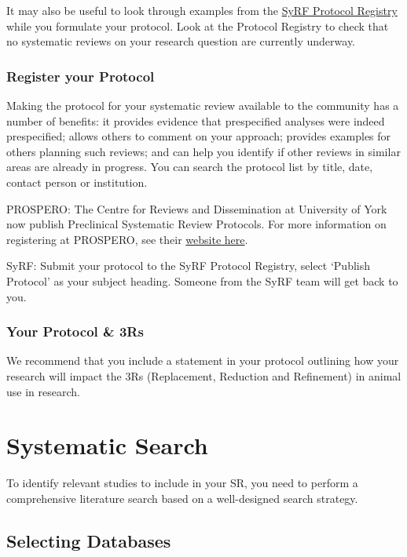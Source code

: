 \documentclass[
]{book}
\begin{document}
It may also be useful to look through examples from the \href{http://syrf.org.uk/protocols/}{SyRF Protocol Registry} while you formulate your protocol. Look at the Protocol Registry to check that no systematic reviews on your research question are currently underway.

\hypertarget{register-your-protocol}{%
\subsection{Register your Protocol}\label{register-your-protocol}}

Making the protocol for your systematic review available to the community has a number of benefits: it provides evidence that prespecified analyses were indeed prespecified; allows others to comment on your approach; provides examples for others planning such reviews; and can help you identify if other reviews in similar areas are already in progress. You can search the protocol list by title, date, contact person or institution.

PROSPERO:
The Centre for Reviews and Dissemination at University of York now publish Preclinical Systematic Review Protocols.
For more information on registering at PROSPERO, see their \href{https://www.crd.york.ac.uk/prospero/}{website here}.

SyRF:
Submit your protocol to the SyRF Protocol Registry, select `Publish Protocol' as your subject heading. Someone from the SyRF team will get back to you.

\hypertarget{your-protocol-3rs}{%
\subsection{Your Protocol \& 3Rs}\label{your-protocol-3rs}}

We recommend that you include a statement in your protocol outlining how your research will impact the 3Rs (Replacement, Reduction and Refinement) in animal use in research.

\hypertarget{systematic-search}{%
\chapter{Systematic Search}\label{systematic-search}}

To identify relevant studies to include in your SR, you need to perform a comprehensive literature search based on a well-designed search strategy.

\hypertarget{selecting-databases}{%
\section{Selecting Databases}\label{selecting-databases}}
\end{document}

